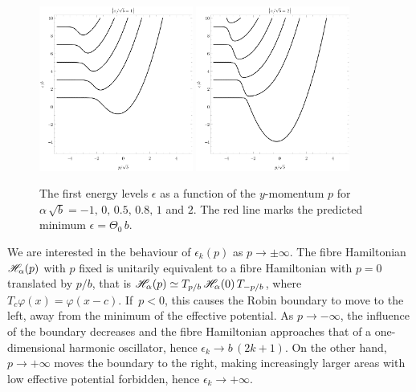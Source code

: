 \begin{figure}[p]
    \\[1em]%
    \includegraphics[width=0.45\textwidth]{grafy/robin1.pdf}%
    \hspace{0.1\textwidth}%
    \includegraphics[width=0.45\textwidth]{grafy/robin2.pdf}\par
    \caption{The first energy levels $\epsilon$ as a function of the $y$-momentum $p$ for $\alpha\,\sqrt{b} = -1, \, 0, \, 0.5, \, 0.8, \, 1$ and $2$. The red line marks the predicted minimum $\epsilon = \Theta_0 \, b$.}
    \label{plots-robin}
\end{figure}

We are interested in the behaviour of $\epsilon_k(p)$ as $p \to \pm \infty$. The fibre Hamiltonian $\mathscr{H}_\alpha(p)$ with $p$ fixed is unitarily equivalent to a fibre Hamiltonian with $p=0$ translated by $p/b$, that is $\mathscr{H}_\alpha(p) \simeq T_{p/b} \, \mathscr{H}_\alpha(0) \, T_{-p/b}$, where $T_c \varphi(x) = {\varphi(x - c)}$. If~$p < 0$, this causes the Robin boundary to move to the left, away from the minimum of the effective potential. As $p \to -\infty$, the influence of the boundary decreases and the fibre Hamiltonian approaches that of a one-dimensional harmonic oscillator, hence $\epsilon_k \to b \, (2k+1)$. On the other hand, $p \to +\infty$ moves the boundary to the right, making increasingly larger areas with low effective potential forbidden, hence $\epsilon_k \to +\infty$.

